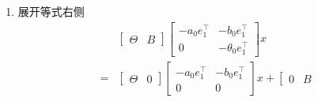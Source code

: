 \documentclass[a4paper,12pt]{article}
\begin{document}
\begin{enumerate}
\begin{align*}
\begin{array}{c|c}
        -a_0e_1^\top & -b_0e_1^\top\\ \hline
        0 & -\theta_0e_1^\top 
        \end{array}
        \right]
        x + \begin{bmatrix}
            b_0 \\ 0
        \end{bmatrix} 
        (u-\varepsilon)
        \right)
        \\ = & 
        A_c \zeta -{\theta_0}e_1^\top x + 
        \left(-a[0]e+b[0](u-\varepsilon)\right) +
        \left[
        \begin{array}{c|c}
        \Theta & B 
        \end{array}
        \right]
        \left(
        \left[
        \begin{array}{c|c}
        -a_0e_1^\top & -b_0e_1^\top\\ \hline
        0 & -\theta_0e_1^\top 
        \end{array}
        \right]
        x + \begin{bmatrix}
            b_0 \\ 0
        \end{bmatrix} 
        (u-\varepsilon)
        \right)
    \end{align*}
    \item 展开等式右侧
    \begin{align*}
        & \left[
        \begin{array}{c|c}
        \Theta & B 
        \end{array}
        \right]
        \left[
        \begin{array}{c|c}
        -a_0e_1^\top & -b_0e_1^\top\\ \hline
        0 & -\theta_0e_1^\top 
        \end{array}
        \right] x
        \\ = &
            \left[
            \begin{array}{c|c}
            \Theta & 0
            \end{array}
            \right]
            \left[
            \begin{array}{c|c}
            -a_0e_1^\top & -b_0e_1^\top\\ \hline
            0 & 0
            \end{array}
            \right] x +
            \left[
            \begin{array}{c|c}
            0 & B
            \end{array}

\end{align*}
\end{enumerate}
\end{document}

